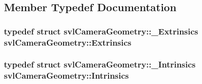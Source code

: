 \subsection{Member Typedef Documentation}
\hypertarget{classsvl_camera_geometry_a6954baa4bd0cc3577af09e13b1c18545}{
\subsubsection[{Extrinsics}]{\setlength{\rightskip}{0pt plus 5cm}typedef struct {\bf svl\-Camera\-Geometry\-::\-\_\-\-Extrinsics}  {\bf svl\-Camera\-Geometry\-::\-Extrinsics}}}\label{classsvl_camera_geometry_a6954baa4bd0cc3577af09e13b1c18545}
\hypertarget{classsvl_camera_geometry_a864f6359614466009baca0666e6bc08e}{
\subsubsection[{Intrinsics}]{\setlength{\rightskip}{0pt plus 5cm}typedef struct {\bf svl\-Camera\-Geometry\-::\-\_\-\-Intrinsics}  {\bf svl\-Camera\-Geometry\-::\-Intrinsics}}}\label{classsvl_camera_geometry_a864f6359614466009baca0666e6bc08e}


